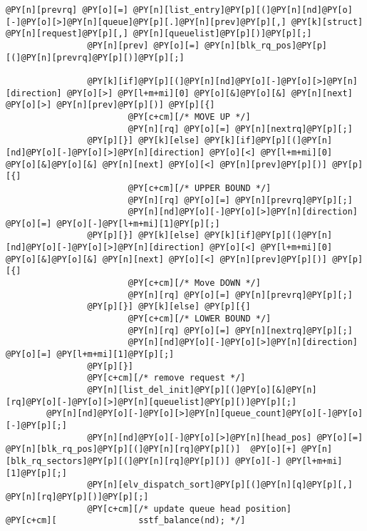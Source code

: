 \begin{Verbatim}[commandchars=@\[\]]
                @PY[n][prevrq] @PY[o][=] @PY[n][list_entry]@PY[p][(]@PY[n][nd]@PY[o][-]@PY[o][>]@PY[n][queue]@PY[p][.]@PY[n][prev]@PY[p][,] @PY[k][struct] @PY[n][request]@PY[p][,] @PY[n][queuelist]@PY[p][)]@PY[p][;]
                @PY[n][prev] @PY[o][=] @PY[n][blk_rq_pos]@PY[p][(]@PY[n][prevrq]@PY[p][)]@PY[p][;]
                                                                
                @PY[k][if]@PY[p][(]@PY[n][nd]@PY[o][-]@PY[o][>]@PY[n][direction] @PY[o][>] @PY[l+m+mi][0] @PY[o][&]@PY[o][&] @PY[n][next] @PY[o][>] @PY[n][prev]@PY[p][)] @PY[p][{]
                        @PY[c+cm][/* MOVE UP */]
                        @PY[n][rq] @PY[o][=] @PY[n][nextrq]@PY[p][;]
                @PY[p][}] @PY[k][else] @PY[k][if]@PY[p][(]@PY[n][nd]@PY[o][-]@PY[o][>]@PY[n][direction] @PY[o][<] @PY[l+m+mi][0] @PY[o][&]@PY[o][&] @PY[n][next] @PY[o][<] @PY[n][prev]@PY[p][)] @PY[p][{]
                        @PY[c+cm][/* UPPER BOUND */]
                        @PY[n][rq] @PY[o][=] @PY[n][prevrq]@PY[p][;]
                        @PY[n][nd]@PY[o][-]@PY[o][>]@PY[n][direction] @PY[o][=] @PY[o][-]@PY[l+m+mi][1]@PY[p][;]
                @PY[p][}] @PY[k][else] @PY[k][if]@PY[p][(]@PY[n][nd]@PY[o][-]@PY[o][>]@PY[n][direction] @PY[o][<] @PY[l+m+mi][0] @PY[o][&]@PY[o][&] @PY[n][next] @PY[o][<] @PY[n][prev]@PY[p][)] @PY[p][{]
                        @PY[c+cm][/* Move DOWN */]
                        @PY[n][rq] @PY[o][=] @PY[n][prevrq]@PY[p][;]
                @PY[p][}] @PY[k][else] @PY[p][{]
                        @PY[c+cm][/* LOWER BOUND */]
                        @PY[n][rq] @PY[o][=] @PY[n][nextrq]@PY[p][;]
                        @PY[n][nd]@PY[o][-]@PY[o][>]@PY[n][direction] @PY[o][=] @PY[l+m+mi][1]@PY[p][;]
                @PY[p][}]
                @PY[c+cm][/* remove request */] 
                @PY[n][list_del_init]@PY[p][(]@PY[o][&]@PY[n][rq]@PY[o][-]@PY[o][>]@PY[n][queuelist]@PY[p][)]@PY[p][;]
		@PY[n][nd]@PY[o][-]@PY[o][>]@PY[n][queue_count]@PY[o][-]@PY[o][-]@PY[p][;]
                @PY[n][nd]@PY[o][-]@PY[o][>]@PY[n][head_pos] @PY[o][=] @PY[n][blk_rq_pos]@PY[p][(]@PY[n][rq]@PY[p][)]  @PY[o][+] @PY[n][blk_rq_sectors]@PY[p][(]@PY[n][rq]@PY[p][)] @PY[o][-] @PY[l+m+mi][1]@PY[p][;]
                @PY[n][elv_dispatch_sort]@PY[p][(]@PY[n][q]@PY[p][,] @PY[n][rq]@PY[p][)]@PY[p][;]
                @PY[c+cm][/* update queue head position]
@PY[c+cm][                sstf_balance(nd); */]
                                

\end{Verbatim}
